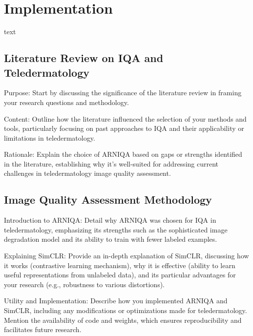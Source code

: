 \chapter{Implementation}
\label{ch:Implementation}
text

\section{Literature Review on IQA and Teledermatology}
\label{sec:LiteratureReviewMethodology}
Purpose: Start by discussing the significance of the literature review in framing your research questions and methodology.\par
\vspace{\baselineskip}
\noindent
Content: Outline how the literature influenced the selection of your methods and tools, particularly focusing on past approaches to IQA and their applicability or limitations in teledermatology.\par
\vspace{\baselineskip}
\noindent
Rationale: Explain the choice of ARNIQA based on gaps or strengths identified in the literature, establishing why it's well-suited for addressing current challenges in teledermatology image quality assessment.\par
\vspace{\baselineskip}
\noindent

\section{Image Quality Assessment Methodology}
\label{sec:IQAMethodology}
Introduction to ARNIQA: Detail why ARNIQA was chosen for IQA in teledermatology, emphasizing its strengths such as the sophisticated image degradation model and its ability to train with fewer labeled examples.\par
\vspace{\baselineskip}
\noindent
Explaining SimCLR: Provide an in-depth explanation of SimCLR, discussing how it works (contrastive learning mechanism), why it is effective (ability to learn useful representations from unlabeled data), and its particular advantages for your research (e.g., robustness to various distortions).\par
\vspace{\baselineskip}
\noindent
Utility and Implementation: Describe how you implemented ARNIQA and SimCLR, including any modifications or optimizations made for teledermatology. Mention the availability of code and weights, which ensures reproducibility and facilitates future research.\par
\vspace{\baselineskip}
\noindent

